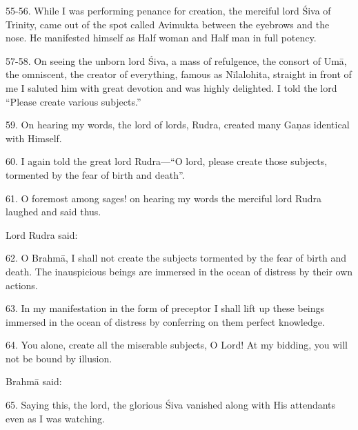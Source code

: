 55-56. While I was performing penance for creation, the merciful lord Śiva of
Trinity, came out of the spot called Avimukta between the eyebrows and the nose.
He manifested himself as Half woman and Half man in full potency.

57-58. On seeing the unborn lord Śiva, a mass of refulgence, the consort of Umā,
the omniscent, the creator of everything, famous as Nīlalohita, straight in
front of me I saluted him with great devotion and was highly delighted. I told
the lord “Please create various subjects.”

59. On hearing my words, the lord of lords, Rudra, created many Gaṇas identical
with Himself.

60. I again told the great lord Rudra—“O lord, please create those subjects,
tormented by the fear of birth and death”.

61. O foremost among sages! on hearing my words the merciful lord Rudra laughed
and said thus.

Lord Rudra said:

62. O Brahmā, I shall not create the subjects tormented by the fear of birth and
death. The inauspicious beings are immersed in the ocean of distress by their
own actions.

63. In my manifestation in the form of preceptor I shall lift up these beings
immersed in the ocean of distress by conferring on them perfect knowledge.

64. You alone, create all the miserable subjects, O Lord! At my bidding, you
will not be bound by illusion.

Brahmā said:

65. Saying this, the lord, the glorious Śiva vanished along with His attendants
even as I was watching.
